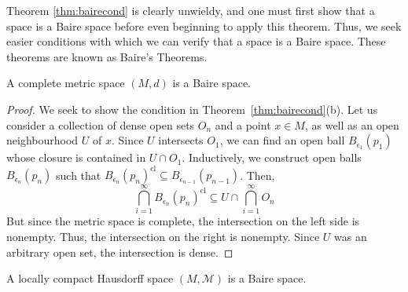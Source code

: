 \documentclass[twoside,symmetric, openany, 12pt]{./tuftebook}
\theoremstyle{definition}
\theoremstyle{definition}
\theoremstyle{definition}
\begin{document}
Theorem \ref{thm:bairecond} is clearly unwieldy, and one must first show that a space is a Baire space before even beginning to apply this theorem. Thus, we seek easier conditions with which we can verify that a space is a Baire space. These theorems are known as Baire's Theorems.
	\begin{Theorem}[Baire I]\label{thm:baire1}
		A complete metric space $(M,d)$ is a Baire space.
	\end{Theorem}
\begin{proof}
	We seek to show the condition in Theorem~\ref{thm:bairecond}(b). Let us consider a collection of dense open sets $O_n$ and a point $x\in M$, as well as an open neighbourhood $U$ of $x$. Since $U$ intersects $O_1$, we can find an open ball $B_{\epsilon_1}(p_1)$ whose closure is contained in $U \cap O_1$. Inductively, we construct open balls $B_{\epsilon_n}(p_n)$ such that $B_{\epsilon_n}(p_n)^\text{cl}\subseteq B_{\epsilon_{n-1}}(p_{n-1})$. Then, 
	\[\bigcap_{i=1}^\infty B_{\epsilon_n}(p_n)^\text{cl}\subseteq U \cap \bigcap_{i=1}^\infty O_n\]
	But since the metric space is complete, the intersection on the left side is nonempty. Thus, the intersection on the right is nonempty. Since $U$ was an arbitrary open set, the intersection is dense. 
\end{proof}
	\begin{Theorem}[Baire II]\label{thm:baire2}
		A locally compact Hausdorff space $(M, \mathcal{M})$ is a Baire space.
	\end{Theorem}
\end{document}
